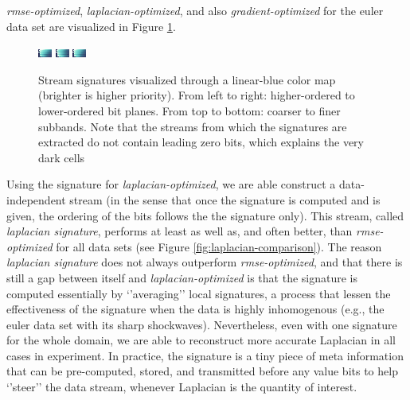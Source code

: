 \emph{rmse-optimized}, \emph{laplacian-optimized}, and also \emph{gradient-optimized} for the euler
data set are visualized in Figure \ref{fig:signature-comparison}. 

\begin{figure}
	\centering
	{\includegraphics[width=0.32\linewidth]{img/gradient-laplacian/SIG-GREEDY-(rmse).png}}
	{\includegraphics[width=0.32\linewidth]{img/gradient-laplacian/SIG-GREEDY-(laplacian).png}}
	{\includegraphics[width=0.32\linewidth]{img/gradient-laplacian/SIG-GREEDY-(gradient).png}}
	\caption{Stream signatures visualized through a linear-blue color map (brighter is higher
	priority). From left to right: higher-ordered to lower-ordered bit planes. From top to bottom:
	coarser to finer subbands. Note that the streams from which the signatures are extracted do not
	contain leading zero bits, which explains the very dark cells }
	\label{fig:signature-comparison}
\end{figure}

Using the signature for \emph{laplacian-optimized}, we are able construct a data-independent stream
(in the sense that once the signature is computed and is given, the ordering of the bits follows the
the signature only). This stream, called \emph{laplacian signature}, performs at least as well as,
and often better, than \emph{rmse-optimized} for all data sets (see Figure
\ref{fig:laplacian-comparison}). The reason \emph{laplacian signature} does not always outperform
\emph{rmse-optimized}, and that there is still a gap between itself and \emph{laplacian-optimized}
is that the signature is computed essentially by `'averaging'' local signatures, a process that
lessen the effectiveness of the signature when the data is highly inhomogenous (e.g., the euler data
set with its sharp shockwaves). Nevertheless, even with one signature for the whole domain, we are
able to reconstruct more accurate Laplacian in all cases in experiment. In practice, the signature
is a tiny piece of meta information that can be pre-computed, stored, and transmitted before any
value bits to help `'steer'' the data stream, whenever Laplacian is the quantity of interest.

